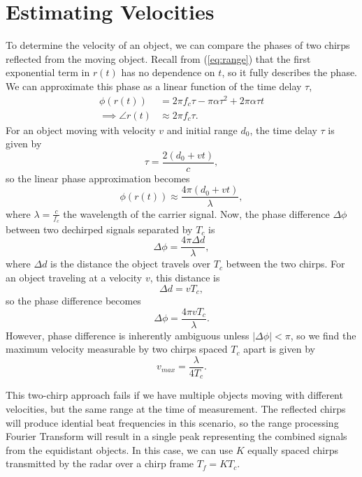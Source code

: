 \chapter{Estimating Velocities}
To determine the velocity of an object, we can compare the phases of two chirps
reflected from the moving object. Recall from (\ref{eq:range}) that the first
exponential term in $r(t)$ has no dependence on $t$, so it fully describes the phase. We
can approximate this phase as a linear function of the time delay $\tau$, 
\begin{align}
	\phi(r(t)) &= 2\pi f_c \tau - \pi \alpha \tau^2 + 2\pi\alpha\tau t \\
	\implies \angle r(t) &\approx 2\pi f_c \tau.
\end{align}
For an object moving with velocity $v$ and initial range $d_0$, the time delay
$\tau$ is given by 
\begin{equation}
	\tau = \frac{2(d_0 + vt)}{c}, \label{eq:moving-tau}
\end{equation}
so the linear phase approximation becomes
\begin{equation}
	\phi(r(t)) \approx \frac{4\pi(d_0 + vt)}{\lambda},
\end{equation}
where $\lambda = \frac{c}{f_c}$ the wavelength of
the carrier signal. Now, the phase difference $\Delta \phi$ between two
dechirped signals separated by
$T_c$ is
\begin{equation}
	\Delta\phi = \frac{4\pi \Delta d}{\lambda},
\end{equation}
where $\Delta d$ is the distance the object travels over $T_c$ between the two
chirps. For an object traveling at a velocity $v$, this distance is
\begin{equation}
	\Delta d = v T_c, 
\end{equation}
so the phase difference becomes
\begin{equation}
	\label{phase_diff}
	\Delta\phi = \frac{4\pi v T_c}{\lambda}.
\end{equation}
However, phase difference is inherently ambiguous unless $|\Delta\phi|<\pi$, so
we find the maximum velocity measurable by two chirps spaced $T_c$ apart is
given by
\begin{equation}
	v_{max} = \frac{\lambda}{4 T_c}.
\end{equation} 

This two-chirp approach fails if we have multiple objects moving with different
velocities, but the same range at the time of measurement. The reflected chirps
will produce idential beat frequencies in this scenario, so the range processing
Fourier Transform will result in a single peak representing the combined signals
from the equidistant objects. In this case, we can use $K$ equally spaced chirps 
transmitted by the radar over a chirp frame $T_f = KT_c$. 

